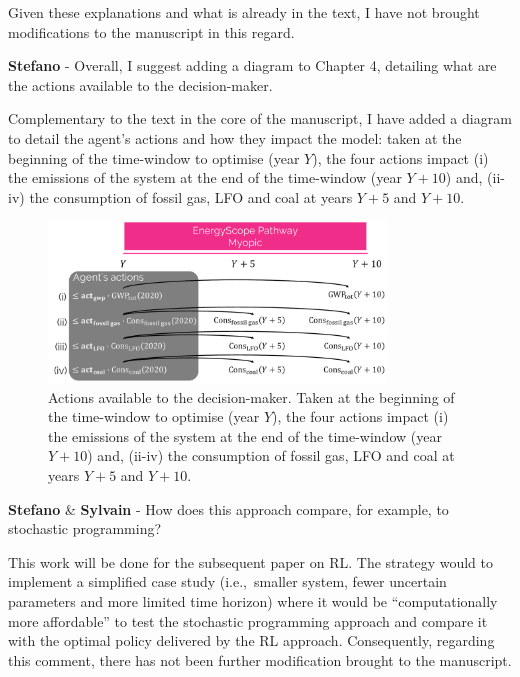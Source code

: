 \documentclass[12pt,a4paper]{article}
\def\ie{i.e.,\ }
\begin{document}
Given these explanations and what is already in the text, I have not brought modifications to the manuscript in this regard.

\begin{mdframed}[style=comment] %
{\color{orange} \textbf{Stefano}} - Overall, I suggest adding a diagram to Chapter 4, detailing what are the actions available to the decision-maker.
\end{mdframed}

\noindent Complementary to the text in the core of the manuscript, I have added a diagram to detail the agent's actions and how they impact the model: taken at the beginning of the time-window to optimise (year $Y$), the four actions impact (i) the emissions of the system at the end of the time-window (year $Y+10$) and, (ii-iv) the consumption of fossil gas, LFO and coal at years $Y+5$ and $Y+10$.

\begin{figure}[!htbp]
\centering
\includegraphics[width=0.8\textwidth]{Schematic_actions.pdf}
\caption{Actions available to the decision-maker. Taken at the beginning of the time-window to optimise (year $Y$), the four actions impact (i) the emissions of the system at the end of the time-window (year $Y+10$) and, (ii-iv) the consumption of fossil gas, LFO and coal at years $Y+5$ and $Y+10$.}
\label{fig:Schematic_actions}
\end{figure}

\begin{mdframed}[style=comment] %
{\color{orange} \textbf{Stefano}} \& {\color{purple} \textbf{Sylvain}} - How does this approach compare, for example, to stochastic programming?
\end{mdframed}

\noindent This work will be done for the subsequent paper on RL. The strategy would to implement a simplified case study (\ie smaller system, fewer uncertain parameters and more limited time horizon) where it would be ``computationally more affordable'' to test the stochastic programming approach and compare it with the optimal policy delivered by the RL approach. Consequently, regarding this comment, there has not been further modification brought to the manuscript.
\end{document}
